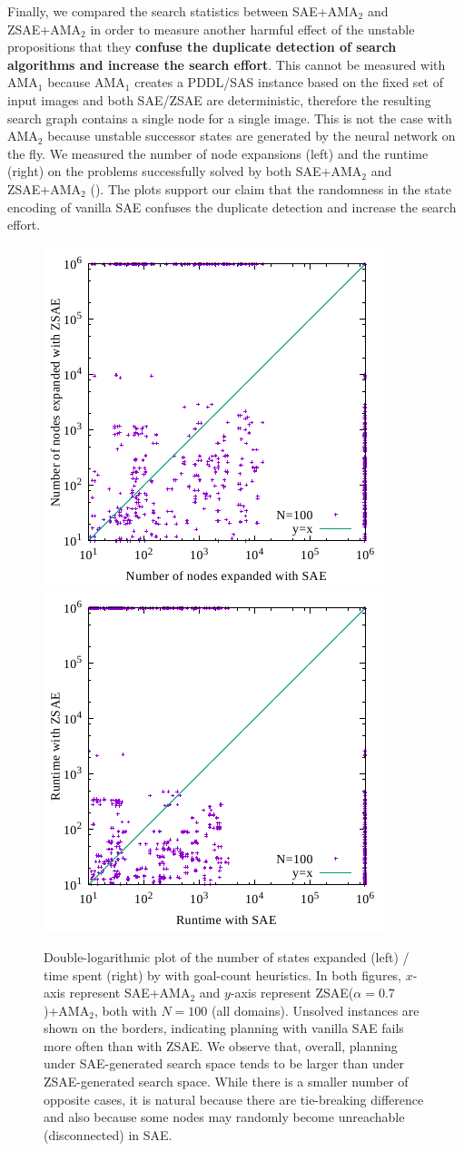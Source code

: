 Finally, we compared the search statistics between SAE+AMA$_2$ and ZSAE+AMA$_2$
in order to measure another harmful effect of the unstable propositions
that they \textbf{confuse the duplicate detection of search algorithms and increase the search effort}.
% 
This cannot be measured with AMA$_1$
because AMA$_1$ creates a PDDL/SAS instance based on the fixed set of
input images and both SAE/ZSAE are
deterministic, therefore the resulting search graph contains a single node for a single image.
This is not the case with AMA$_2$ because unstable successor states
are generated by the neural network on the fly.
% 
We measured the number of node expansions (left) and the runtime (right)
on the problems successfully solved by both SAE+AMA$_2$ and ZSAE+AMA$_2$ ().
The plots support our claim that
the randomness in the state encoding of vanilla SAE confuses the duplicate detection and
increase the search effort.

\begin{figure}[htb]
 \centering
 \includegraphics[width=0.4\linewidth]{img/static/exp.pdf}
 \includegraphics[width=0.4\linewidth]{img/static/time.pdf}
 \caption{Double-logarithmic plot of the number of states expanded (left) / time spent (right) by
\astar with goal-count heuristics.
In both figures,
$x$-axis represent SAE+AMA$_2$ and
$y$-axis represent ZSAE($\alpha=0.7$)+AMA$_2$, both with $N=100$ (all domains).
Unsolved instances are shown on the borders, indicating planning with vanilla SAE fails more often than with ZSAE.
We observe that, overall, planning under SAE-generated search space tends to be larger
than under ZSAE-generated search space.
While there is a smaller number of opposite cases, it is natural because
there are tie-breaking difference and also because some nodes may randomly become unreachable (disconnected) in SAE.
}
 \label{fig:ama2-statistics}
\end{figure}


